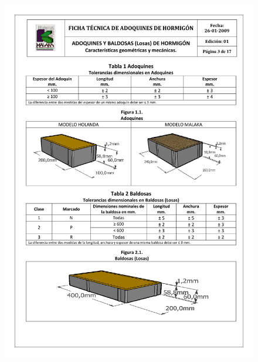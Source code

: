 \begin{figure}[!htb]
\centering
\includegraphics[scale=0.68]{ficha_tecnica/ft_adoquin_3.pdf}
\label{fig:ftadoquin3}
\end{figure}
\newpage
